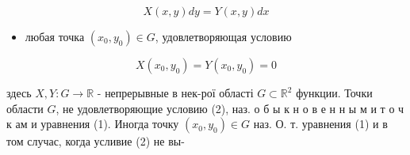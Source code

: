 \documentclass[10pt]{article}
\begin{document}
\[

X(x, y) d y=Y(x, y) d x

\]



\begin{itemize}

  \item любая точка $\left(x_{0}, y_{0}\right) \in G$, удовлетворяющая условию

\end{itemize}



\[

X\left(x_{0}, y_{0}\right)=Y\left(x_{0}, y_{0}\right)=0

\]



здесь $X, Y: G \rightarrow \mathbb{R}$ - непрерывные в нек-рої області $G \subset \mathbb{R}^{2}$ функции. Точки области $G$, не удовлетворяющие условию (2), наз. о б ы к н о в е н н ы м и т о ч к ам и уравнения (1). Иногда точку $\left(x_{0}, y_{0}\right) \in G$ наз. О. т. уравнения (1) и в том случас, когда усливие (2) не вы-
\end{document}
